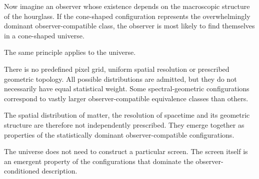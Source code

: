 Now imagine an observer whose existence depends on the macroscopic structure of the hourglass. If the cone-shaped configuration represents the overwhelmingly dominant observer-compatible class, the observer is most likely to find themselves in a cone-shaped universe.

The same principle applies to the universe.

There is no predefined pixel grid, uniform spatial resolution or prescribed geometric topology. All possible distributions are admitted, but they do not necessarily have equal statistical weight.
Some spectral-geometric configurations correspond to vastly larger observer-compatible equivalence classes than others.

The spatial distribution of matter, the resolution of spacetime and its geometric structure are therefore not independently prescribed.
They emerge together as properties of the statistically dominant observer-compatible configurations.

The universe does not need to construct a particular screen. The screen itself is an emergent property of the configurations that dominate the observer-conditioned description.


